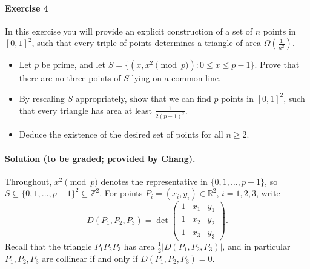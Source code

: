 \documentclass[a4paper,12pt]{article}
\newcommand{\card}[1]{\left| #1 \right|}
\newcommand{\mb}[1]{\mathbb{#1}}
\begin{document}
\paragraph{Exercise 4}  In this exercise you will provide an explicit construction of a set of $n$ points in $[0,1]^2$, such that every triple of points determines a triangle of area $\Omega \left( \frac{1}{n^2} \right)$.
\begin{itemize}
	\item[(a)] Let $p$ be prime, and let $S = \{ (x, x^2 \pmod{p} ) : 0 \le x \le p-1 \}$. Prove that there are no three points of $S$ lying on a common line.
	\item[(b)] By rescaling $S$ appropriately, show that we can find $p$ points in $[0,1]^2$, such that every triangle has area at least $\frac{1}{2(p-1)^2}$.
	\item[(c)] Deduce the existence of the desired set of points for all $n \ge 2$.
\end{itemize}

\paragraph{Solution (to be graded; provided by Chang).} Throughout, $x^2 \pmod p$ denotes the representative in $\{0, 1, \hdots, p-1\}$, so $S \subseteq \{0, 1, \hdots, p-1\}^2 \subseteq \mb Z^2$. For points $P_i = (x_i, y_i) \in \mb R^2$, $i = 1, 2, 3$, write
\[
	D(P_1, P_2, P_3) = \det \begin{pmatrix} 1 & x_1 & y_1 \\ 1 & x_2 & y_2 \\ 1 & x_3 & y_3 \end{pmatrix}.
\]
Recall that the triangle $P_1 P_2 P_3$ has area $\frac12 \card{D(P_1, P_2, P_3)}$, and in particular $P_1, P_2, P_3$ are collinear if and only if $D(P_1, P_2, P_3) = 0$.
\end{document}
